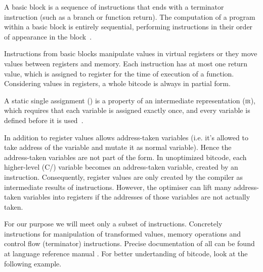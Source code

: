 \begin{definition}\label{def:basicblock}
A basic block is a sequence of instructions that ends with a terminator
instruction (such as a branch or function return). The computation of a program
within a basic block is entirely sequential, performing instructions in their
order of appearance in the block~\cite{Rockai15}.
\end{definition}

Instructions from basic blocks manipulate values in virtual registers or
they move values between registers and memory. Each instruction has at most one
return value, which is assigned to register for the time of execution of a
function. Considering values in registers, a whole \LLVM bitcode is always in
partial \SSA form.

\begin{definition}\label{def:ssa}
A static single assignment (\SSA{}) is a property of an intermediate representation
(\textsc{ir}), which requires that each variable is assigned exactly once, and every
variable is defined before it is used~\cite{Cytron91}.
\end{definition}

In addition to register values \LLVMIR allows address-taken variables (i.e. it's
allowed to take address of the variable and mutate it as normal variable).
Hence the address-taken variables are not part of the \SSA form. In unoptimized
\LLVM bitcode, each higher-level (C/\Cpp{}) variable becomes an address-taken
variable, created by an  instruction. Consequently, register values are only
created by the compiler as intermediate results of instructions. However, the \LLVM
optimiser can lift many address-taken variables into registers if the addresses
of those variables are not actually taken.

For our purpose we will meet only a subset of \LLVM instructions. Concretely
instructions for manipulation of transformed values, memory operations and
control flow (terminator) instructions. Precise documentation of all can be
found at \LLVM language reference manual \cite{LLVM:langref}. For better
undertanding of \LLVM bitcode, look at the following example.


